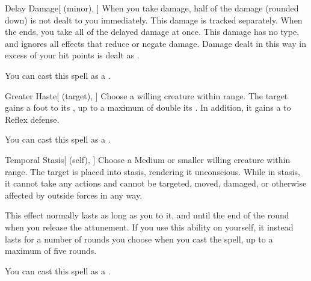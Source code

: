 \lowercase{\hypertarget{spell:Delay Damage}{}}\label{spell:Delay Damage}
\begin{apability}[\nth{3}]{\hypertarget{spell:Delay Damage}{Delay Damage}}[ (minor), ]
When you take damage, half of the damage (rounded down) is not dealt to you immediately.
This damage is tracked separately.
When the ends, you take all of the delayed damage at once.
This damage has no type, and ignores all effects that reduce or negate damage.
Damage dealt in this way in excess of your hit points is dealt as .

You can cast this spell as a .
\end{apability}
\vspace{0.25em}



\lowercase{\hypertarget{spell:Greater Haste}{}}\label{spell:Greater Haste}
\begin{attuneability}[\nth{3}]{\hypertarget{spell:Greater Haste}{Greater Haste}}[ (target), ]
Choose a willing creature within \rngmed range.
The target gains a  foot  to its , up to a maximum of double its .
In addition, it gains a   to Reflex defense.

You can cast this spell as a .
\end{attuneability}
\vspace{0.25em}



\lowercase{\hypertarget{spell:Temporal Stasis}{}}\label{spell:Temporal Stasis}
\begin{attuneability}[\nth{3}]{\hypertarget{spell:Temporal Stasis}{Temporal Stasis}}[ (self), ]
Choose a Medium or smaller willing creature within \rngmed range.
The target is placed into stasis, rendering it unconscious.
While in stasis, it cannot take any actions and cannot be targeted, moved, damaged, or otherwise affected by outside forces in any way.

This effect normally lasts as long as you  to it, and until the end of the round when you release the attunement.
If you use this ability on yourself, it instead lasts for a number of rounds you choose when you cast the spell, up to a maximum of five rounds.

You can cast this spell as a .
\end{attuneability}
\vspace{0.25em}



